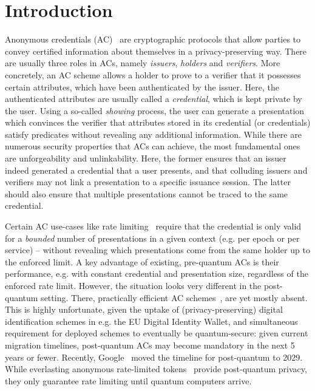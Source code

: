 \section{Introduction}
\label{sec:intro}

Anonymous credentials (AC)~\cite{chaum85-anonymous-credentials,EC:Brands95,EC:CamLys01} are cryptographic protocols that allow parties to convey certified information about themselves in a privacy-preserving way. There are usually three roles in ACs, namely \emph{issuers}, \emph{holders} and \emph{verifiers}.  More concretely, an AC scheme allows a holder to prove to a verifier that it possesses certain attributes, which have been authenticated by the issuer. Here, the authenticated attributes are usually called a \emph{credential}, which is kept private by the user. Using a so-called \emph{showing} process, the user can generate a presentation which convinces the verifier that attributes stored in its credential (or credentials) satisfy predicates without revealing any additional information. While there are numerous security properties that ACs can achieve, the most fundamental ones are unforgeability and unlinkability. Here, the former ensures that an issuer indeed generated a credential that a user presents, and that colluding issuers and verifiers may not link a presentation to a specific issuance session.  The latter should also ensure that multiple presentations cannot be traced to the same credential.

Certain AC use-cases like rate limiting~\cite{ietf-privacypass-arc-protocol-01,schlesinger-cfrg-act-00} require that the credential is only valid for a \emph{bounded} number of presentations in a given context (e.g. per epoch or per service) -- without revealing which presentations come from the same holder up to the enforced limit.
A key advantage of existing, pre-quantum ACs is their performance, e.g. with constant credential and presentation size, regardless of the enforced rate limit. However, the situation looks very different in the post-quantum setting. There, practically efficient AC schemes~\cite{CCS:BLNS23,CCS:AGJLRS24,EPRINT:PWFW23}, are yet mostly absent. This is highly unfortunate, given the uptake of (privacy-preserving) digital identification schemes in e.g. the EU Digital Identity Wallet, and simultaneous requirement for deployed schemes to eventually be quantum-secure: given current migration timelines, post-quantum ACs may become mandatory in the next 5 years or fewer. Recently, Google~\cite{google-pq} moved the timeline for post-quantum to 2029.
While everlasting anonymous rate-limited tokens~\cite{AC:CDLT25} provide post-quantum privacy, they only guarantee rate limiting until quantum computers arrive.

